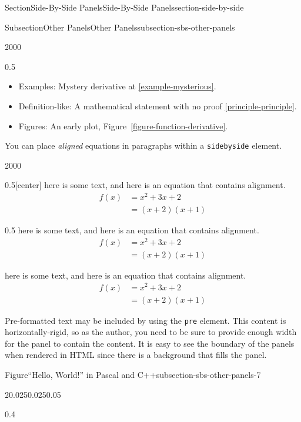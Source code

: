 \documentclass[twoside,10pt,]{article}
\newcommand{\xreffont}{\relax}
\newcommand{\mono}[1]{\texttt{#1}}
\numberwithin{equation}{section}
\begin{document}
\begin{sectionptx}{Section}{Side-By-Side Panels}{}{Side-By-Side Panels}{}{}{section-side-by-side}
\begin{subsectionptx}{Subsection}{Other Panels}{}{Other Panels}{}{}{subsection-sbs-other-panels}
\begin{sidebyside}{2}{0}{0}{0}
\begin{sbspanel}{0.5}
\begin{itemize}[label=\textbullet]
\item{}Examples: Mystery derivative at \hyperref[example-mysterious]{{\xreffont\ref{example-mysterious}}}.%
\item{}Definition-like: A mathematical statement with no proof \hyperref[principle-principle]{{\xreffont\ref{principle-principle}}}.%
\item{}Figures: An early plot, Figure~\hyperref[figure-function-derivative]{{\xreffont\ref{figure-function-derivative}}}.%
\end{itemize}
\end{sbspanel}%
\end{sidebyside}%
\par
You can place \emph{aligned} equations in paragraphs within a \mono{sidebyside} element.%
\begin{sidebyside}{2}{0}{0}{0}%
\begin{sbspanel}{0.5}[center]%
here is some text, and here is an equation that contains alignment.%
\begin{align*}
f(x)&= x^2+3x+2\\
&=(x+2)(x+1)
\end{align*}
%
\end{sbspanel}%
\begin{sbspanel}{0.5}%
here is some text, and here is an equation that contains alignment.%
\begin{align*}
f(x)&= x^2+3x+2\\
&=(x+2)(x+1)
\end{align*}
%
\par
here is some text, and here is an equation that contains alignment.%
\begin{align*}
f(x)&= x^2+3x+2\\
&=(x+2)(x+1)
\end{align*}
%
\end{sbspanel}%
\end{sidebyside}%
\par
Pre-formatted text may be included by using the \mono{pre} element.  This content is horizontally-rigid, so as the author, you need to be sure to provide enough width for the panel to contain the content.  It is easy to see the boundary of the panels when rendered in HTML since there is a background that fills the panel.%
\begin{figureptx}{Figure}{``Hello, World!'' in Pascal and C++}{subsection-sbs-other-panels-7}{}%
\begin{sidebyside}{2}{0.025}{0.025}{0.05}%
\begin{sbspanel}{0.4}%

\end{sbspanel}
\end{sidebyside}
\end{figureptx}
\end{subsectionptx}
\end{sectionptx}
\end{document}
